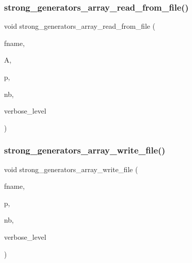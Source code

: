 \subsubsection{\texorpdfstring{strong\+\_\+generators\+\_\+array\+\_\+read\+\_\+from\+\_\+file()}{strong\_generators\_array\_read\_from\_file()}}
{\footnotesize\ttfamily void strong\+\_\+generators\+\_\+array\+\_\+read\+\_\+from\+\_\+file (\begin{DoxyParamCaption}\item[{const \mbox{\hyperlink{galois_8h_ab6cc7b4aeb6ea31aba2b3fbfc83ff5e6}{B\+Y\+TE}} $\ast$}]{fname,  }\item[{\mbox{\hyperlink{classaction}{action}} $\ast$}]{A,  }\item[{\mbox{\hyperlink{classstrong__generators}{strong\+\_\+generators}} $\ast$\&}]{p,  }\item[{\mbox{\hyperlink{galois_8h_a09fddde158a3a20bd2dcadb609de11dc}{I\+NT}} \&}]{nb,  }\item[{\mbox{\hyperlink{galois_8h_a09fddde158a3a20bd2dcadb609de11dc}{I\+NT}}}]{verbose\+\_\+level }\end{DoxyParamCaption})}

\mbox{\label{strong__generators_8_c_a05972d528ab7056885299e2d37354dd0}} 
\subsubsection{\texorpdfstring{strong\+\_\+generators\+\_\+array\+\_\+write\+\_\+file()}{strong\_generators\_array\_write\_file()}}
{\footnotesize\ttfamily void strong\+\_\+generators\+\_\+array\+\_\+write\+\_\+file (\begin{DoxyParamCaption}\item[{const \mbox{\hyperlink{galois_8h_ab6cc7b4aeb6ea31aba2b3fbfc83ff5e6}{B\+Y\+TE}} $\ast$}]{fname,  }\item[{\mbox{\hyperlink{classstrong__generators}{strong\+\_\+generators}} $\ast$}]{p,  }\item[{\mbox{\hyperlink{galois_8h_a09fddde158a3a20bd2dcadb609de11dc}{I\+NT}}}]{nb,  }\item[{\mbox{\hyperlink{galois_8h_a09fddde158a3a20bd2dcadb609de11dc}{I\+NT}}}]{verbose\+\_\+level }\end{DoxyParamCaption})}

